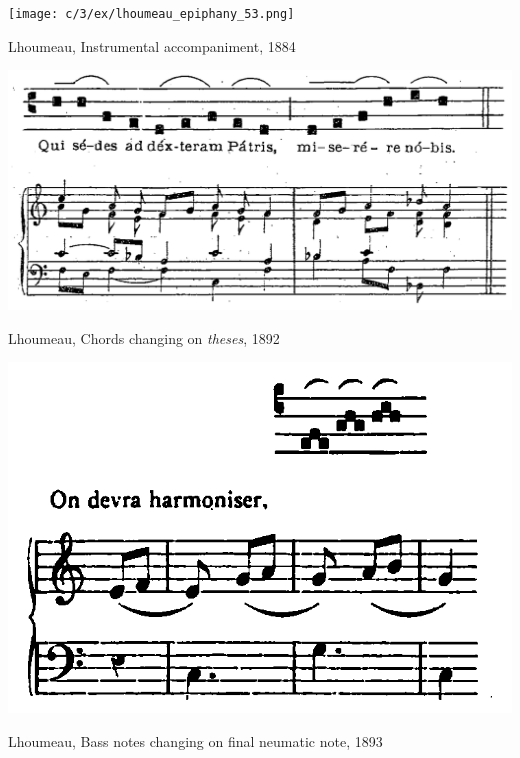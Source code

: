 \vspace*{\fill}

\begin{example}
  \centering
  \texttt{[image: c/3/ex/lhoumeau\_epiphany\_53.png]}
  \caption{Lhoumeau, Instrumental accompaniment, 1884}
  \label{mus:lhoumeau_epiphany_53}
\end{example}

\vspace*{\fill}

\clearpage

\vspace*{\fill}

\begin{example}
  \centering
  \includegraphics[width=.9\linewidth]{c/3/ex/lhoumeau_syllabic.png}
  \caption{Lhoumeau, Chords changing on \emph{theses}, 1892}
  \label{mus:lhoumeau_syllabic}
\end{example}

\vspace*{\fill}

\begin{example}
  \centering
  \includegraphics[width=.6\linewidth]{c/3/ex/lhoumeau_torculus.png}
  \caption{Lhoumeau, Bass notes changing on final neumatic note, 1893}
  \label{mus:lhoumeau_torculus}
\end{example}

\vspace*{\fill}

